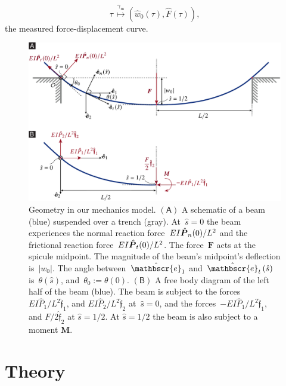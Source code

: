\documentclass[preprint,10pt,times]{elsarticle}
\numberwithin{equation}{section}
\newcommand{\physe}{\hat{\mathbscr{e}}} %
\newcommand{\physf}{\hat{\boldsymbol{\mathfrak{f}}}}
\renewcommand{\u}[1]{\boldsymbol{#1}}
\newcommand{\chat}[1]{\skew{4}\hat{#1}}
\newcommand{\pr}[1]{\left( #1 \right)}
\newcommand{\subf}[1]{\pr{\textsf{#1}}}
\begin{document}
\begin{equation}
\tau\,\stackrel{\gamma_{\text{m}}}{\mapsto}\pr{\hat{w}_{0}(\tau),\hat{F}(\tau)},\label{def:MeasuredForceDisplacementCurveND}
\end{equation}the measured force-displacement curve.

\begin{figure}
\centering{}\includegraphics[width=1\textwidth]{../Figures_Submit/BeamSchematic_V15.pdf}
\caption{
\label{fig:BeamSchematic}
Geometry in our mechanics model. %
$\subf{A}$ A schematic of a beam (blue) suspended over a trench (gray). %
At~$\hat{s} = 0$ the beam  experiences the normal reaction
force~$E I\chat{\u{P}}_n(0)/L^2$ and the
frictional reaction force~$E I\chat{\u{P}}_t(0)/L^2$. %
The force~$\u{F}$ acts at the spicule midpoint. %
The magnitude of the beam's midpoint's deflection is~$|w_0|$. %
The angle between~$\physe_1$ and~$\physe_{t}\pr{\hat{s}}$ is~$\theta\pr{\hat{s}}$, and~$\theta_0 :=\theta(0)$. %
$\subf{B}$ A free body diagram of the left half of the beam (blue). %
The beam is subject to the
forces~$E I\hat{P}_1/L^2\physf_1$, and $E I\hat{P}_2/L^2\physf_2$ at~$\hat{s} = 0$,
and the forces~$-E I\hat{P}_1/L^2\physf_1$, and $F/2\physf_{2}$ at $\hat{s}=1/2$. %
At $\hat{s}=1/2$ the beam is also subject to a moment $\u{M}$. %
}
\end{figure}

\section{Theory\label{sec:results}}
\end{document}
